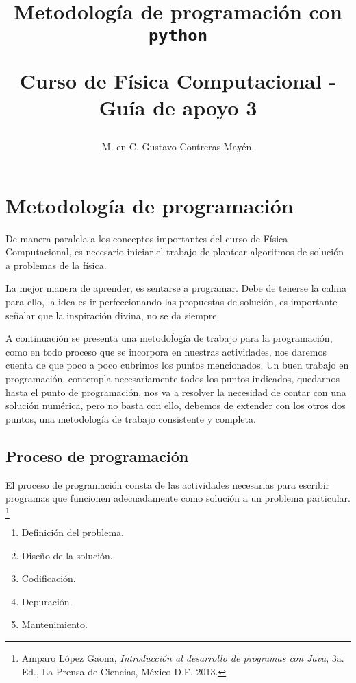 
\title{Metodología de programación con \texttt{python} \\ \begin{Large}Curso de Física Computacional - Guía de apoyo 3 \end{Large}}
\author{M. en C. Gustavo Contreras Mayén.}
%

\maketitle
\fontsize{14}{14}\selectfont
\section{Metodología de programación}
De manera paralela a los conceptos importantes del curso de Física Computacional, es necesario iniciar el trabajo de plantear algoritmos de solución a problemas de la física.
\par
La mejor manera de aprender, es sentarse a programar. Debe de tenerse la calma para ello, la idea es ir perfeccionando las propuestas de solución, es importante señalar que la inspiración divina, no se da siempre.
\par
A continuación se presenta una metodoĺogía de trabajo para la programación, como en todo proceso que se incorpora en nuestras actividades, nos daremos cuenta de que poco a poco cubrimos los puntos mencionados. Un buen trabajo en programación, contempla necesariamente todos los puntos indicados, quedarnos hasta el punto de programación, nos va a resolver la necesidad de contar con una solución numérica, pero no basta con ello, debemos de extender con los otros dos puntos, una metodología de trabajo consistente y completa.
\subsection{Proceso de programación}
El proceso de programación consta de las actividades necesarias para escribir programas que funcionen adecuadamente como solución a un problema particular. \footnote{Amparo López Gaona, \textit{Introducción al desarrollo de programas con Java}, 3a. Ed., La Prensa de Ciencias, México D.F. 2013.}
\begin{enumerate}
\item Definición del problema.
\item Diseño de la solución.
\item Codificación.
\item Depuración.
\item Mantenimiento.
\end{enumerate}
